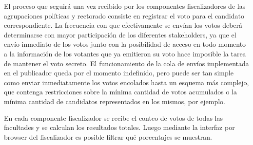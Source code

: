El proceso que seguirá una vez recibido por los componentes fiscalizadores de las agrupaciones políticas y rectorado consiste en registrar el voto para el candidato correspondiente. La frecuencia con que efectivamente se envían los votos deberá determinarse con mayor participación de los diferentes stakeholders, ya que el envío inmediato de los votos junto con la posibilidad de acceso en todo momento a la información de los votantes que ya emitieron su voto hace imposible la tarea de mantener el voto secreto. El funcionamiento de la cola de envíos implementada en el publicador queda por el momento indefinido, pero puede ser tan simple como enviar inmediatamente los votos encolados hasta un esquema más complejo, que contenga restricciones sobre la mínima cantidad de votos acumulados o la mínima cantidad de candidatos representados en los mismos, por ejemplo.

En cada componente fiscalizador se recibe el conteo de votos de todas las facultades y se calculan los resultados totales. Luego mediante la interfaz por browser del fiscalizador es posible filtrar qué porcentajes se muestran.

